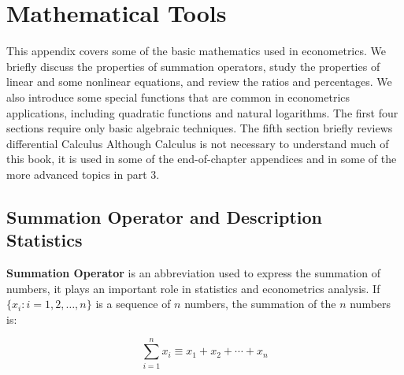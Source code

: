 \documentclass[11pt,bibend=bibtex]{elegantbook}
\begin{document}
\nocite{en2,en3}

\printbibliography[heading=bibintoc, title=\ebibname]
\appendix


\chapter{Mathematical Tools}

This appendix covers some of the basic mathematics used in econometrics. We briefly discuss the properties of summation operators, study the properties of linear and some nonlinear equations, and review the ratios and percentages. We also introduce some special functions that are common in econometrics applications, including quadratic functions and natural logarithms. The first four sections require only basic algebraic techniques. The fifth section briefly reviews differential Calculus Although Calculus is not necessary to understand much of this book, it is used in some of the end-of-chapter appendices and in some of the more advanced topics in part 3.

\section{Summation Operator and Description Statistics}

\textbf{Summation Operator} is an abbreviation used to express the summation of numbers, it plays an important role in statistics and econometrics analysis. If $\{x_i: i=1, 2, \ldots, n\}$ is a sequence of $n$ numbers, the summation of the $n$ numbers is:

\begin{equation}
\sum_{i=1}^n x_i \equiv x_1 + x_2 +\cdots + x_n
\end{equation}
\end{document}
